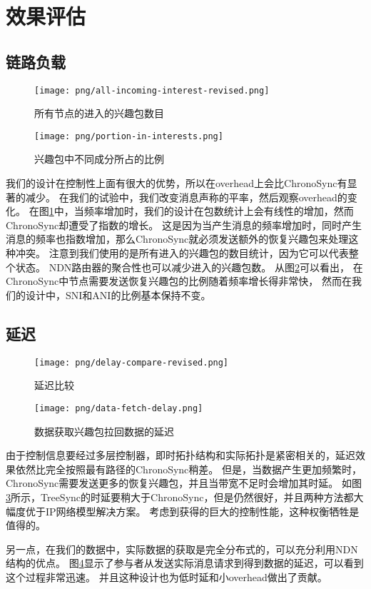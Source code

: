 \section{效果评估}

\subsection{链路负载}

\begin{figure}
\centering
\texttt{[image: png/all-incoming-interest-revised.png]}
\caption{所有节点的进入的兴趣包数目}
\label{fig:overhead}
\end{figure}
\begin{figure}
\centering
\texttt{[image: png/portion-in-interests.png]}
\caption{兴趣包中不同成分所占的比例}
\label{fig:interest_percentage}
\end{figure}

我们的设计在控制性上面有很大的优势，所以在overhead上会比ChronoSync有显著的减少。
在我们的试验中，我们改变消息声称的平率，然后观察overhead的变化。
在图\ref{fig:overhead}中，当频率增加时，我们的设计在包数统计上会有线性的增加，然而ChronoSync却遭受了指数的增长。
这是因为当产生消息的频率增加时，同时产生消息的频率也指数增加，那么ChronoSync就必须发送额外的恢复兴趣包来处理这种冲突。
注意到我们使用的是所有进入的兴趣包的数目统计，因为它可以代表整个状态。
NDN路由器的聚合性也可以减少进入的兴趣包数。
从图\ref{fig:interest_percentage}可以看出，
在ChronoSync中节点需要发送恢复兴趣包的比例随着频率增长得非常快，
然而在我们的设计中，SNI和ANI的比例基本保持不变。

\subsection{延迟}

\begin{figure}
\centering
\texttt{[image: png/delay-compare-revised.png]}
\caption{延迟比较}
\label{fig:delay_compare}
\end{figure}

\begin{figure}
\centering
\texttt{[image: png/data-fetch-delay.png]}
\caption{数据获取兴趣包拉回数据的延迟}
\label{fig:data_fetch_delay}
\end{figure}

由于控制信息要经过多层控制器，即时拓扑结构和实际拓扑是紧密相关的，延迟效果依然比完全按照最有路径的ChronoSync稍差。
但是，当数据产生更加频繁时，ChronoSync需要发送更多的恢复兴趣包，并且当带宽不足时会增加其时延。
如图\ref{fig:delay_compare}所示，TreeSync的时延要稍大于ChronoSync，但是仍然很好，并且两种方法都大幅度优于IP网络模型解决方案。
考虑到获得的巨大的控制性能，这种权衡牺牲是值得的。

另一点，在我们的数据中，实际数据的获取是完全分布式的，可以充分利用NDN结构的优点。
图\ref{fig:data_fetch_delay}显示了参与者从发送实际消息请求到得到数据的延迟，可以看到这个过程非常迅速。
并且这种设计也为低时延和小overhead做出了贡献。
